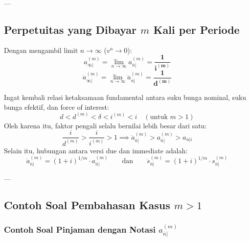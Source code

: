 \documentclass[11pt,a4paper]{article}
\begin{document}
---

\subsection{Perpetuitas yang Dibayar \texorpdfstring{$m$}{m} Kali per Periode}

Dengan mengambil limit $n \to \infty$ ($v^n \to 0$):
\begin{equation}
    a_{\overline{\infty}|}^{(m)} = \lim_{n \to \infty} a_{\overline{n}|}^{(m)} = \mathbf{\frac{1}{i^{(m)}}}
\end{equation}
\begin{equation}
    \ddot{a}_{\overline{\infty}|}^{(m)} = \lim_{n \to \infty} \ddot{a}_{\overline{n}|}^{(m)} = \mathbf{\frac{1}{d^{(m)}}}
\end{equation}

\begin{notebox}
Ingat kembali relasi ketaksamaan fundamental antara suku bunga nominal, suku bunga efektif, dan force of interest:
\begin{equation}
    d < d^{(m)} < \delta < i^{(m)} < i \quad (\text{untuk } m > 1)
\end{equation}
Oleh karena itu, faktor pengali selalu bernilai lebih besar dari satu:
\begin{equation}
    \frac{i}{d^{(m)}} > \frac{i}{i^{(m)}} > 1 \implies \ddot{a}_{\overline{n}|}^{(m)} > a_{\overline{n}|}^{(m)} > a_{\overline{n}|i}
\end{equation}
Selain itu, hubungan antara versi due dan immediate adalah:
\begin{equation}
    \ddot{a}_{\overline{n}|}^{(m)} = (1+i)^{1/m} \cdot a_{\overline{n}|}^{(m)} \qquad \text{dan} \qquad \ddot{s}_{\overline{n}|}^{(m)} = (1+i)^{1/m} \cdot s_{\overline{n}|}^{(m)}
\end{equation}
\end{notebox}

---

\subsection{Contoh Soal Pembahasan Kasus \texorpdfstring{$m > 1$}{m > 1}}

\subsubsection{Contoh Soal Pinjaman dengan Notasi \texorpdfstring{$a_{\overline{n}|}^{(m)}$}{a\_n\textasciicircum(m)}}
\end{document}

